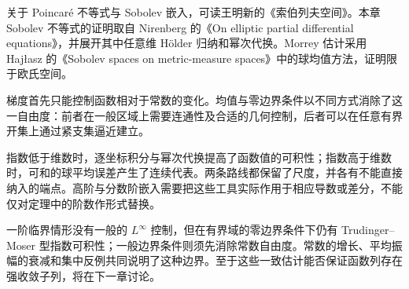 \ProseParagraphBreak

关于 Poincaré 不等式与 Sobolev 嵌入，可读王明新的《索伯列夫空间》\cite[第2.6--2.11节]{Wang2013SobolevChinese}。本章 Sobolev 不等式的证明取自 Nirenberg 的《On elliptic partial differential equations》\cite[Lecture II]{Nirenberg1959Elliptic}，并展开其中任意维 Hölder 归纳和幂次代换。Morrey 估计采用 Hajłasz 的《Sobolev spaces on metric-measure spaces》\cite{Hajlasz2003SobolevMetric}中的球均值方法，证明限于欧氏空间。







\begin{chaptersummary}
梯度首先只能控制函数相对于常数的变化。均值与零边界条件以不同方式消除了这一自由度：前者在一般区域上需要连通性及合适的几何控制，后者可以在任意有界开集上通过紧支集逼近建立。

\ProseParagraphBreak

指数低于维数时，逐坐标积分与幂次代换提高了函数值的可积性；指数高于维数时，可和的球平均误差产生了连续代表。两条路线都保留了尺度，并各有不能直接纳入的端点。高阶与分数阶嵌入需要把这些工具实际作用于相应导数或差分，不能仅对定理中的阶数作形式替换。

\ProseParagraphBreak

一阶临界情形没有一般的 \(L^\infty\) 控制，但在有界域的零边界条件下仍有 Trudinger--Moser 型指数可积性；一般边界条件则须先消除常数自由度。常数的增长、平均振幅的衰减和集中反例共同说明了这种边界。至于这些一致估计能否保证函数列存在强收敛子列，将在下一章讨论。
\end{chaptersummary}

\BookExercises


